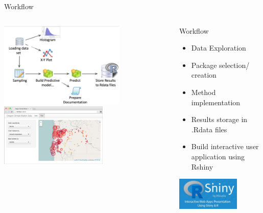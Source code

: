 \documentclass[aspectratio=169,10pt]{beamer}
\begin{document}
\begin{frame}[fragile]{Workflow}
\begin{columns}
\begin{column}{0.6\textwidth}
\includegraphics[width=0.7\textwidth]{amal-wf0.png}
\\
\includegraphics[width=0.6\textwidth]{amal-wf1.jpg}
\end{column}
\begin{column}{0.4\textwidth}
 \begin{alertblock}{Workflow}
\begin{itemize}
    \item Data Exploration
    \item Package selection/ creation
     \item Method implementation
     \item Results storage in .Rdata files
      \item Build interactive user application using Rshiny
 
\end{itemize}
\end{alertblock}
\centering
\includegraphics[width=0.7\textwidth]{amal-wf2.jpg}
\end{column}
\end{columns}
\end{frame}
\end{document}
